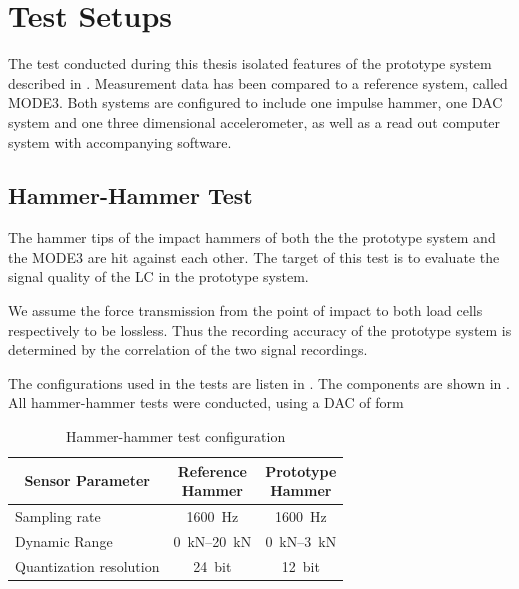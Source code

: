 \chapter{Test Setups%
  \label{chap:\currfilebase}}

The test conducted during this thesis isolated features of the prototype system described in . Measurement data has been compared to a reference system, called MODE3. Both systems are configured to include one impulse hammer, one \ac{DAC} system and one three dimensional accelerometer, as well as a read out computer system with accompanying software.

\section{Hammer-Hammer Test}

The hammer tips of the impact hammers of both the the prototype system and the MODE3 are hit against each other. The target of this test is to evaluate the signal quality of the \ac{LC} in the prototype system.

We assume the force transmission from the point of impact to both load cells respectively to be lossless. Thus the recording accuracy of the prototype system is determined by the correlation of the two signal recordings.

The configurations used in the tests are listen in . The components are shown in . All hammer-hammer tests were conducted, using a \ac{DAC} of form 

\begin{table}
  \centering
  {\renewcommand{\arraystretch}{1}%
  \footnotesize
  \begin{tabular}{lcc}
    \toprule
    \multicolumn{1}{c}{Sensor Parameter} & \makecell{Reference\\Hammer} & \makecell{Prototype\\Hammer}\\
    \midrule
    Sampling rate & \SI{1600}{\hertz} & \SI{1600}{\hertz}\\
    Dynamic Range & \SIrange{0}{20}{\kilo\newton} & \SIrange{0}{3}{\kilo\newton}\\
    Quantization resolution & \SI{24}{bit} & \SI{12}{bit}\\
    \bottomrule
  \end{tabular}
  \caption[Hammer-Hammer Test Configuration]{Hammer-hammer test configuration%
    \label{tab:hh_config}}
  \normalsize
  }
\end{table}

